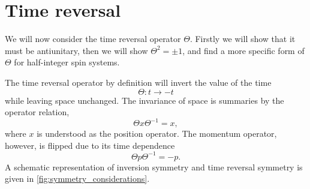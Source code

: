 \section{Time reversal}
We will now consider the time reversal operator $\Theta $.
Firstly we will show that it must be antiunitary, then we will show $\Theta^2 = \pm 1$, and find a more specific form of $\Theta$ for half-integer spin systems.


The time reversal operator by definition will invert the value of the time
$$
\Theta: t \rightarrow -t
$$
while leaving space unchanged.
The invariance of space is summaries by the operator relation,
\begin{equation}
  \label{eq:TRdef}
  \Theta x \Theta^{-1} = x,
\end{equation}
where $x$ is understood as the position operator.
The momentum operator, however, is flipped due to its time dependence
\begin{equation}
  \label{eq:Pdef}
  \Theta p \Theta^{-1} = - p.
\end{equation}
A schematic representation of inversion symmetry and time reversal symmetry is given in \cref{fig:symmetry_considerations}.

